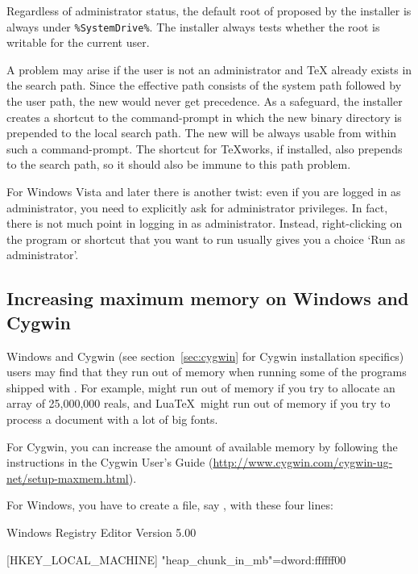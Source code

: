 \documentclass{article}
\begin{document}
Regardless of administrator status, the default root of \TL{} proposed
by the installer is always under \verb|%SystemDrive%|. The installer
always tests whether the root is writable for the current user.

A problem may arise if the user is not an administrator and \TeX{}
already exists in the search path.  Since the effective path
consists of the system path followed by the user path, the new \TL{}
would never get precedence.  As a safeguard, the installer creates a
shortcut to the command-prompt in which the new \TL{} binary
directory is prepended to the local search path.  The new \TL{} will
be always usable from within such a command-prompt. The shortcut for
\TeX{}works, if installed, also prepends \TL{} to the search path, so it
should also be immune to this path problem.

For Windows Vista and later there is another twist: even if you are
logged in as administrator, you need to explicitly ask for administrator
privileges. In fact, there is not much point in logging in as
administrator. Instead, right-clicking on the program or shortcut that
you want to run usually gives you a choice `Run as administrator'.

\subsection{Increasing maximum memory on Windows and Cygwin}
\label{sec:cygwin-maxmem}

Windows and Cygwin (see section~\ref{sec:cygwin} for Cygwin installation
specifics) users may find that they run out of memory when running some
of the programs shipped with \TL.  For example,  might run out
of memory if you try to allocate an array of 25,000,000 reals, and
Lua\TeX\ might run out of memory if you try to process a document with a
lot of big fonts.

For Cygwin, you can increase the amount of available memory by following
the instructions in the Cygwin User's Guide
(\url{http://www.cygwin.com/cygwin-ug-net/setup-maxmem.html}).

For Windows, you have to create a file, say , with
these four lines:

\begin{sverbatim}
Windows Registry Editor Version 5.00

[HKEY_LOCAL_MACHINE\Software\Cygwin]
"heap_chunk_in_mb"=dword:ffffff00
\end{sverbatim}
\end{document}
